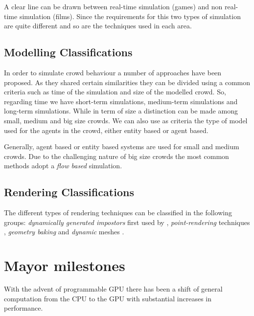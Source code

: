\documentclass[conference]{acmsiggraph}
\begin{document}
A clear line can be drawn between real-time simulation (games) and non real-time simulation (films).
Since the requirements for this two types of simulation are quite different and so are the techniques used in each area.

\subsection{Modelling Classifications}

In order to simulate crowd behaviour a number of approaches have been proposed.
As they shared certain similarities they can be divided using a common criteria such as time of the simulation and size of the modelled crowd.
So, regarding time we have short-term simulations, medium-term simulations and long-term simulations.
While in term of size a distinction can be made among small, medium and big size crowds.
We can also use as criteria the type of model used for the agents in the crowd, either entity based or agent based.

Generally, agent based or entity based systems are used for small and medium crowds.
Due to the challenging nature of big size crowds the most common methods adopt a \textit{flow based} simulation.

\subsection{Rendering Classifications}

The different types of rendering techniques can be classified in the following groups: \textit{dynamically generated impostors} first used by  \cite{Aubel2000}, \textit{point-rendering} techniques \cite{Wand2002}, \textit{geometry baking} \cite{Ulicny2004} and \textit{dynamic} meshes \cite{Ciechomski2005}.

%

\section{Mayor milestones}

With the advent of programmable GPU there has been a shift of general computation from the CPU to the GPU with substantial increases in performance.
\end{document}

